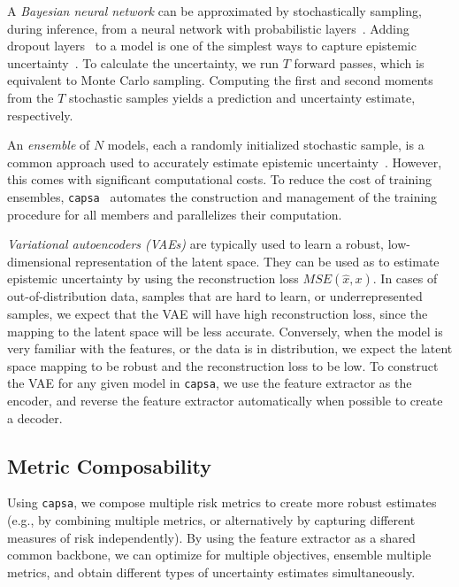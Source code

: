 \documentclass{article} %
\def\capsa{\texttt{{capsa}}}
\newcommand{\todo}[1]{\textcolor{red}{[\textbf{TODO}: #1]}}
\begin{document}
A \textit{Bayesian neural network} can be approximated by stochastically sampling, during inference, from a neural network with probabilistic layers~\citep{blundell2015weight, gal2016dropout}. Adding dropout layers~\citep{srivastava2014dropout} to a model is one of the simplest ways to capture epistemic uncertainty~\citep{gal2016dropout}. To calculate the uncertainty, we run $T$ forward passes, which is equivalent to Monte Carlo sampling. Computing the first and second moments from the $T$ stochastic samples yields a prediction and uncertainty estimate, respectively. 

An \textit{ensemble} of $N$ models, each a randomly initialized stochastic sample, is a common approach used to accurately estimate epistemic uncertainty~\citep{lakshminarayanan2017simple}. However, this comes with significant computational costs. To reduce the cost of training ensembles, \capsa~ automates the construction and management of the training procedure for all members and parallelizes their computation. 

\textit{Variational autoencoders (VAEs)} are typically used to learn a robust, low-dimensional representation of the latent space. They can be used as to estimate epistemic uncertainty by using the reconstruction loss $MSE(\hat{x}, x)$. In cases of out-of-distribution data, samples that are hard to learn, or underrepresented samples, we expect that the VAE will have high reconstruction loss, since the mapping to the latent space will be less accurate. Conversely, when the model is very familiar with the features, or the data is in distribution, we expect the latent space mapping to be robust and the reconstruction loss to be low. To construct the VAE for any given model in \capsa, we use the feature extractor as the encoder, and reverse the feature extractor automatically when possible to create a decoder. 

\subsection{Metric Composability}

Using \capsa, we compose multiple risk metrics to create more robust estimates (e.g., by combining multiple metrics, or alternatively by capturing different measures of risk independently). By using the feature extractor as a shared common backbone, we can optimize for multiple objectives, ensemble multiple metrics, and obtain different types of uncertainty estimates simultaneously.
\end{document}

